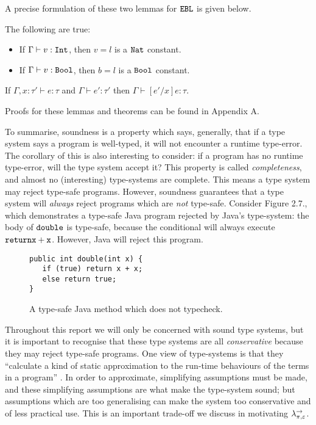 A precise formulation of these two lemmas for $\mathtt{EBL}$ is given below.

\begin{lemma}
The following are true:
\begin{itemize}
	\setlength\itemsep{-0.7em}
	\item If $\Gamma \vdash v: \mathtt{Int}$, then $v = l$ is a $\mathtt{Nat}$ constant.
	\item If $\Gamma \vdash v: \mathtt{Bool}$, then $b = l$ is a $\mathtt{Bool}$ constant.
\end{itemize}
\end{lemma}


\begin{lemma}[Substitution]
If $\Gamma, x: \tau' \vdash e: \tau$ and $\Gamma \vdash e': \tau'$ then $\Gamma \vdash [e'/x]e:  \tau$.
\end{lemma}

Proofs for these lemmas and theorems can be found in Appendix A.

To summarise, soundness is a property which says, generally, that if a type system says a program is well-typed, it will not encounter a runtime type-error. The corollary of this is also interesting to consider: if a program has no runtime type-error, will the type system accept it? This property is called \textit{completeness}, and almost no (interesting) type-systems are complete. This means a type system may reject type-safe programs. However, soundness guarantees that a type system will \textit{always} reject programs which are \textit{not} type-safe. Consider Figure 2.7., which demonstrates a type-safe Java program rejected by Java's type-system: the body of $\mathtt{double}$ is type-safe, because the conditional will always execute $\mathtt{return x+x}$. However, Java will reject this program.

\begin{figure}[h]
\vspace{-5pt}

\begin{lstlisting}
public int double(int x) {
   if (true) return x + x;
   else return true;
}
\end{lstlisting}
 
\vspace{-12pt}
\caption{A type-safe Java method which does not typecheck.}
\label{This is the label.}
\end{figure}

Throughout this report we will only be concerned with sound type systems, but it is important to recognise that these type systems are all \textit{conservative} because they may reject type-safe programs. One view of type-systems is that they ``calculate a kind of static  approximation to the run-time behaviours of the terms in a program'' \cite[p. 2]{tapl}. In order to approximate, simplifying assumptions must be made, and these simplifying assumptions are what make the type-system sound; but assumptions which are too generalising can make the system too conservative and of less practical use. This is an important trade-off we discuss in motivating $\lambda^{\rightarrow}_{\pi, \varepsilon}$.



